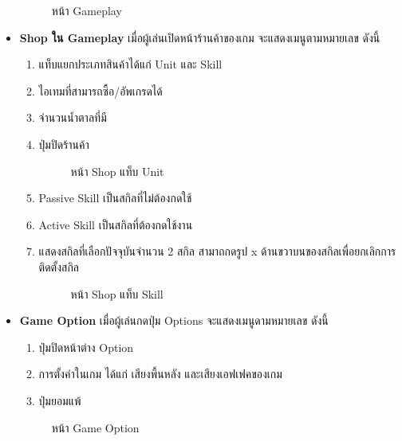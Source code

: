 \documentclass[12pt,oneside,openright,a4paper]{cpe-thai-project}
\begin{document}
\begin{itemize}
  \begin{figure}[H]\centering
    \setlength{\fboxsep}{0cm}
    \caption{หน้า Gameplay}\label{fig:3-13}
  \end{figure}
  

  \item \textbf{Shop ใน Gameplay} เมื่อผู้เล่นเปิดหน้าร้านค้าของเกม จะแสดงเมนูตามหมายเลข ดังนี้
  \begin{enumerate}
    \item แท็บแยกประเภทสินค้าได้แก่ Unit และ Skill
    \item ไอเทมที่สามารถซื้อ/อัพเกรดได้
    \item จำนวนน้ำตาลที่มี
    \item ปุ่มปิดร้านค้า
    
    \begin{figure}[H]\centering
      \setlength{\fboxsep}{0cm}
      \caption{หน้า Shop แท็บ Unit}\label{fig:3-14}
    \end{figure}

    \item Passive Skill เป็นสกิลที่ไม่ต้องกดใช้
    \item Active Skill เป็นสกิลที่ต้องกดใช้งาน
    \item แสดงสกิลที่เลือกปัจจุบันจำนวน 2 สกิล สามาถกดรูป x 
    ด้านขวาบนของสกิลเพื่อยกเลิกการติดตั้งสกิล

    \begin{figure}[H]\centering
      \setlength{\fboxsep}{0cm}
      \caption{หน้า Shop แท็บ Skill}\label{fig:3-15}
    \end{figure}

  \end{enumerate}
  
  \pagebreak
  \item \textbf{Game Option} เมื่อผู้เล่นกดปุ่ม Options จะแสดงเมนูดามหมายเลข ดังนี้
  \begin{enumerate}
    \item ปุ่มปิดหน้าต่าง Option
    \item การตั้งค่าในเกม ได้แก่ เสียงพื้นหลัง และเสียงเอฟเฟคของเกม
    \item ปุ่มยอมแพ้
  \end{enumerate}

  \begin{figure}[H]\centering
    \setlength{\fboxsep}{0cm}
    \caption{หน้า Game Option}\label{fig:3-16}
  \end{figure}
  

\end{itemize}
\end{document}

